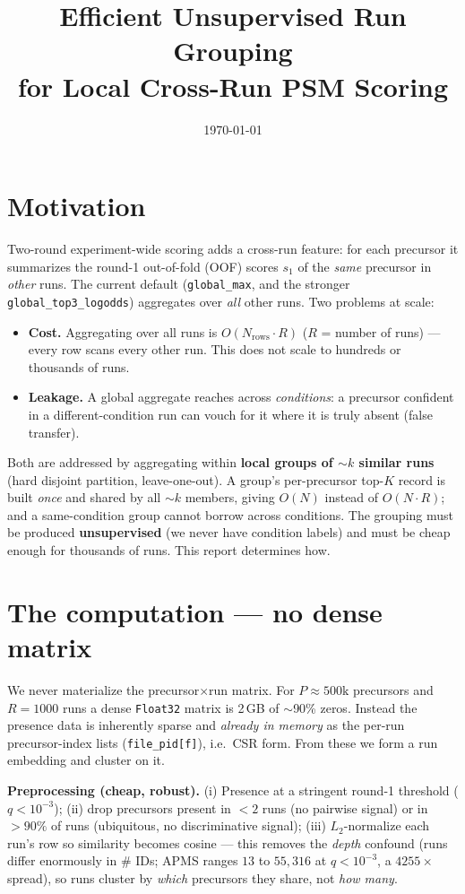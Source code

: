\documentclass[11pt]{article}
\title{\vspace{-1.4cm}\textbf{Efficient Unsupervised Run Grouping\\for Local Cross-Run PSM Scoring}}
\author{}\date{\today}
\newcommand{\code}[1]{\texttt{\small #1}}
\begin{document}
\maketitle\vspace{-1.0cm}

\section{Motivation}
Two-round experiment-wide scoring adds a cross-run feature: for each precursor it summarizes the
round-1 out-of-fold (OOF) scores $s_1$ of the \emph{same} precursor in \emph{other} runs. The current
default (\code{global\_max}, and the stronger \code{global\_top3\_logodds}) aggregates over
\emph{all} other runs. Two problems at scale:
\begin{itemize}[nosep]
  \item \textbf{Cost.} Aggregating over all runs is $O(N_{\text{rows}}\cdot R)$ ($R$ = number of
  runs) --- every row scans every other run. This does not scale to hundreds or thousands of runs.
  \item \textbf{Leakage.} A global aggregate reaches across \emph{conditions}: a precursor confident
  in a different-condition run can vouch for it where it is truly absent (false transfer).
\end{itemize}
Both are addressed by aggregating within \textbf{local groups of $\sim k$ similar runs} (hard
disjoint partition, leave-one-out). A group's per-precursor top-$K$ record is built \emph{once} and
shared by all $\sim k$ members, giving $O(N)$ instead of $O(N\cdot R)$; and a same-condition group
cannot borrow across conditions. The grouping must be produced \textbf{unsupervised} (we never have
condition labels) and must be cheap enough for thousands of runs. This report determines how.

\section{The computation --- no dense matrix}
We never materialize the precursor$\times$run matrix. For $P\!\approx\!500\text{k}$ precursors and
$R\!=\!1000$ runs a dense \code{Float32} matrix is 2\,GB of $\sim$90\% zeros. Instead the presence
data is inherently sparse and \emph{already in memory} as the per-run precursor-index lists
(\code{file\_pid[f]}), i.e.\ CSR form. From these we form a run embedding and cluster on it.

\textbf{Preprocessing (cheap, robust).} (i) Presence at a stringent round-1 threshold
($q<10^{-3}$); (ii) drop precursors present in $<2$ runs (no pairwise signal) or in $>90\%$ of runs
(ubiquitous, no discriminative signal); (iii) $L_2$-normalize each run's row so similarity becomes
cosine --- this removes the \emph{depth} confound (runs differ enormously in \# IDs; APMS ranges
$13$ to $55{,}316$ at $q<10^{-3}$, a $4255\times$ spread), so runs cluster by \emph{which}
precursors they share, not \emph{how many}.
\end{document}
